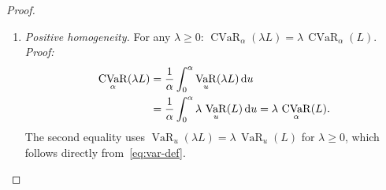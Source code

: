 \documentclass[12pt,openany]{book}
\DeclareMathOperator{\CVaR}{CVaR}
\DeclareMathOperator{\VaR}{VaR}
\numberwithin{equation}{chapter}
\theoremstyle{plain}
\theoremstyle{definition}
\theoremstyle{remark}
\begin{document}
\begin{proof}
\begin{enumerate}[label=\textbf{Step \arabic*.}, leftmargin=*,
                  widest=Step 6., itemsep=1ex]
\begin{enumerate}[label=(\alph*), leftmargin=*]
          \item \emph{Positive homogeneity.}
                For any $\lambda \geq 0$:
                $\CVaR_\alpha(\lambda L) = \lambda\,\CVaR_\alpha(L)$.
                \textit{Proof:}
                \begin{align}
                  \CVaR_\alpha(\lambda L)
                  &= \frac{1}{\alpha}\int_0^\alpha
                     \VaR_u(\lambda L)\,\mathrm{d}u
                  \notag\\
                  &= \frac{1}{\alpha}\int_0^\alpha
                     \lambda\,\VaR_u(L)\,\mathrm{d}u
                  = \lambda\,\CVaR_\alpha(L).
                  \label{eq:cvar-hom}
                \end{align}
                The second equality uses
                $\VaR_u(\lambda L) = \lambda\,\VaR_u(L)$
                for $\lambda \geq 0$, which follows directly
                from~\eqref{eq:var-def}.


\end{enumerate}
\end{enumerate}
\end{proof}
\end{document}
